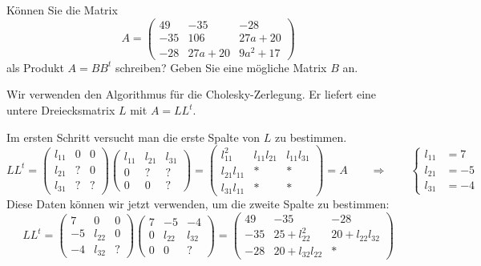 Können Sie die Matrix
\[
A=\begin{pmatrix}
49& -35&-28\\
-35&106&27a + 20\\
-28&27a + 20&9a^2 + 17
\end{pmatrix}
\]
als Produkt $A=BB^t$ schreiben? Geben Sie eine mögliche Matrix $B$ an.


\begin{loesung}
Wir verwenden den Algorithmus für die Cholesky-Zerlegung. Er liefert eine 
untere Dreiecksmatrix $L$ mit $A = LL^t$.

Im ersten Schritt versucht man die erste Spalte von $L$ zu bestimmen.
\[
LL^t=
\begin{pmatrix}
l_{11}&  0&  0\\
l_{21}&  ?&  0\\
l_{31}&  ?&  ?
\end{pmatrix}
\begin{pmatrix}
l_{11}&l_{21}&l_{31}\\
     0&     ?&     ?\\
     0&     0&     ?
\end{pmatrix}
=
\begin{pmatrix}
    l_{11}^2&l_{11}l_{21}&l_{11}l_{31}\\
l_{21}l_{11}&           *&           *\\
l_{31}l_{11}&           *&           *
\end{pmatrix}
=
A
\qquad\Rightarrow\qquad
\left\{
\begin{aligned}
l_{11}&=7\\
l_{21}&=-5\\
l_{31}&=-4
\end{aligned}
\right.
\]
Diese Daten können wir jetzt verwenden, um die zweite Spalte zu bestimmen:
\[
LL^t
=
\begin{pmatrix}
7&     0&0\\
-5&l_{22}&0\\
-4&l_{32}&?
\end{pmatrix}
\begin{pmatrix}
7&    -5&    -4\\
0&l_{22}&l_{32}\\
0&     0&?
\end{pmatrix}
=
\begin{pmatrix}
49&    -35&    -28\\
-35& 25+l_{22}^2  & 20+l_{22}l_{32}\\
-28& 20+l_{32}l_{22}&         *

\end{pmatrix}\]
\end{loesung}
